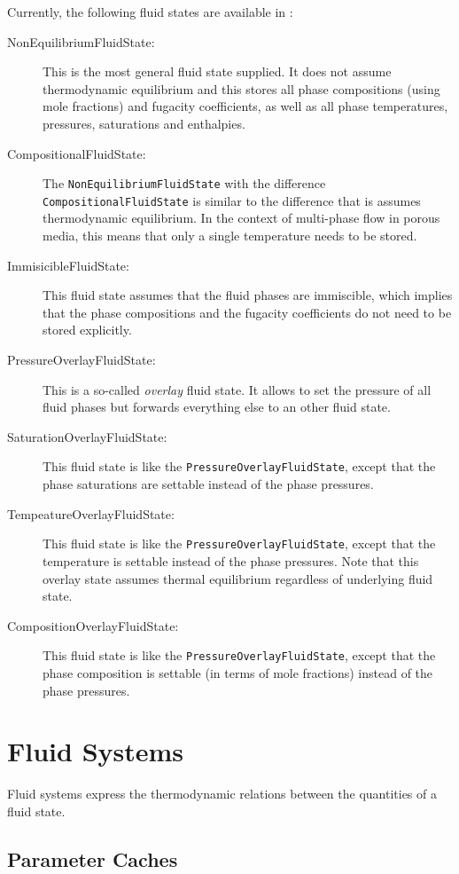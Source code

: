 Currently, the following fluid states are available in \Dumux:
\begin{description}
\item[NonEquilibriumFluidState:] This is the most general
  fluid state supplied. It does not assume thermodynamic equilibrium
  and this stores all phase compositions (using mole fractions) and
  fugacity coefficients, as well as all phase temperatures, pressures,
  saturations and enthalpies.
\item[CompositionalFluidState:] The
  \texttt{Non\-Equilibrium\-Fluid\-State} with the difference
  \texttt{Compositional\-Fluid\-State} is similar to the difference that
  is assumes thermodynamic equilibrium. In the context of multi-phase
  flow in porous media, this means that only a single temperature
  needs to be stored.
\item[ImmisicibleFluidState:] This fluid state assumes that
  the fluid phases are immiscible, which implies that the phase
  compositions and the fugacity coefficients do not need to be stored
  explicitly.
\item[PressureOverlayFluidState:] This is a so-called {\em
    overlay} fluid state. It allows to set the pressure of all fluid
  phases but forwards everything else to an other fluid state.
\item[SaturationOverlayFluidState:] This fluid state is like
  the \texttt{PressureOverlayFluidState}, except that the phase
  saturations are settable instead of the phase pressures.
\item[TempeatureOverlayFluidState:] This fluid state is like
  the \texttt{PressureOverlayFluidState}, except that the temperature
  is settable instead of the phase pressures. Note that this overlay
  state assumes thermal equilibrium regardless of underlying fluid
  state.
\item[CompositionOverlayFluidState:] This fluid state is like
  the \texttt{PressureOverlayFluidState}, except that the phase
  composition is settable (in terms of mole fractions) instead of the
  phase pressures.
\end{description}

\section{Fluid Systems}

Fluid systems express the thermodynamic relations between the
quantities of a fluid state.

\subsection{Parameter Caches}

